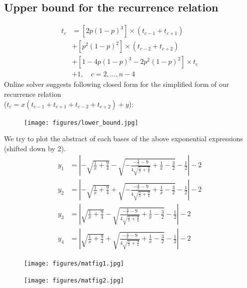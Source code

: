 \documentclass[]{book}
\theoremstyle{definition}
\begin{document}
\subsection{Upper bound for the recurrence relation}
\begin{equation}
\begin{split}
    t_c &= \left[2p\left(1-p\right)^3\right] \times \left( t_{c-1}+t_{c+1} \right) \\
    &+ \left[p^2\left(1-p\right)^2\right] \times \left( t_{c-2}+t_{c+2} \right) \\
    &+ \left[1-4p\left(1-p\right)^3-2p^2\left(1-p\right)^2\right] \times t_c \\
    &+ 1,  \quad c = 2,\ldots,n-4
\end{split}
\end{equation}
Online solver suggests following closed form for the simplified form of our recurrence relation \\ ($t_c = x\left( t_{c-1} + t_{c+1} + t_{c-2} + t_{c+2} \right) + y$):
\begin{figure}[H]
    \centering
    \texttt{[image: figures/lower\_bound.jpg]}
    \caption{}
\end{figure}
We try to plot the abstract of each bases of the above exponential expressions (shifted down by 2).
\begin{equation}
\begin{split}
    y_1 &=\left| -\sqrt{\frac{1}{x}+\frac{9}{4}} - \sqrt{-\frac{-\frac{4}{x}-9}{4\sqrt{\frac{1}{x}+\frac{9}{4}}}+\frac{1}{x}-\frac{3}{2}} - \frac{1}{2} \right|-2 \\
    y_2 &=\left| -\sqrt{\frac{1}{x}+\frac{9}{4}} + \sqrt{-\frac{-\frac{4}{x}-9}{4\sqrt{\frac{1}{x}+\frac{9}{4}}}+\frac{1}{x}-\frac{3}{2}} - \frac{1}{2} \right|-2 \\
    y_3 &=\left| \sqrt{\frac{1}{x}+\frac{9}{4}} - \sqrt{\frac{-\frac{4}{x}-9}{4\sqrt{\frac{1}{x}+\frac{9}{4}}}+\frac{1}{x}-\frac{3}{2}} - \frac{1}{2} \right|-2 \\
    y_4 &=\left| \sqrt{\frac{1}{x}+\frac{9}{4}} + \sqrt{\frac{-\frac{4}{x}-9}{4\sqrt{\frac{1}{x}+\frac{9}{4}}}+\frac{1}{x}-\frac{3}{2}} - \frac{1}{2} \right|-2
\end{split}
\end{equation}
\begin{figure}[H]
    \centering
    \texttt{[image: figures/matfig1.jpg]}
    \caption{}
\end{figure}
\begin{figure}[H]
    \centering\texttt{[image: figures/matfig2.jpg]}
    \caption{}
\end{figure}
\end{document}
